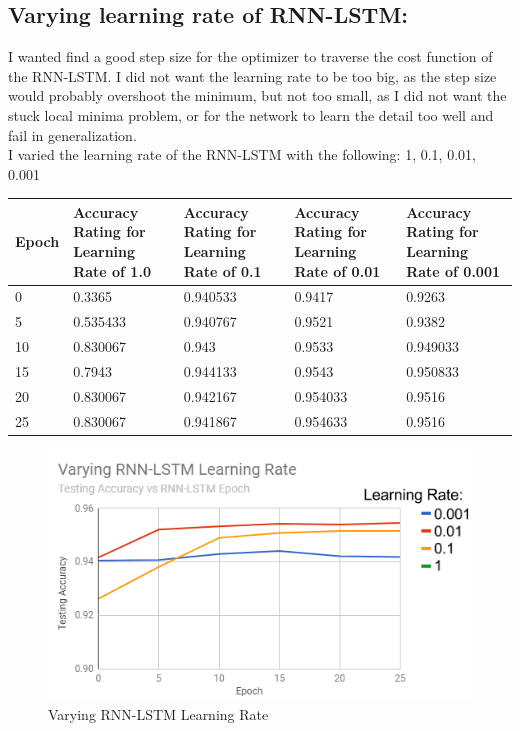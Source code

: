 \documentclass[a4paper]{article}
\begin{document}
\subsection{Varying learning rate of RNN-LSTM:}
\hspace*{10mm}
I wanted find a good step size for the optimizer to traverse the cost function of the RNN-LSTM. I did not want the learning rate to be too big, as the step size would probably overshoot the minimum, but not too small, as I did not want the stuck local minima problem, or for the network to learn the detail too well and fail in generalization.
\\\hspace*{10mm}
I varied the learning rate of the RNN-LSTM with the following: 1, 0.1, 0.01, 0.001

\begin{center}
 \begin{tabular}{||p{3cm}|p{3cm}|p{3cm}|p{3cm}|p{3cm}||} 
 \hline


Epoch&
Accuracy Rating for Learning Rate of  1.0&
Accuracy Rating for Learning Rate of 0.1&
Accuracy Rating for Learning Rate of 0.01&
Accuracy Rating for Learning Rate of 0.001\\[0.5ex]\hline\hline
0&
0.3365&
0.940533&
0.9417&
0.9263\\
\hline
5&
0.535433&
0.940767&
0.9521&
0.9382\\
\hline
10&
0.830067&
0.943&
0.9533&
0.949033\\
\hline
15&
0.7943&
0.944133&
0.9543&
0.950833\\
\hline
20&
0.830067&
0.942167&
0.954033&
0.9516\\
\hline
25&
0.830067&
0.941867&
0.954633&
0.9516\\
\hline

\end{tabular}
\pagebreak
\begin{figure}[h]
\centering
\includegraphics[width=5.5in]{varyLearnRNN}\caption{Varying RNN-LSTM Learning Rate}\label{fig:XSS}
\end{figure}
\end{center}
\end{document}
